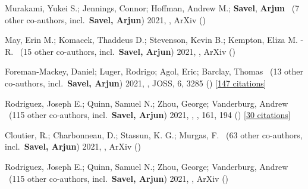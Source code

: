 \item[{\color{numcolor}\scriptsize9}] Murakami, Yukei S.; Jennings, Connor; Hoffman, Andrew M.; \textbf{Savel}, \textbf{Arjun} \etal\ ({7} other co-authors, incl.\ \textbf{Savel, Arjun}) 2021, , ArXiv ()

\item[{\color{numcolor}\scriptsize8}] May, Erin M.; Komacek, Thaddeus D.; Stevenson, Kevin B.; Kempton, Eliza M. -R. \etal\ ({15} other co-authors, incl.\ \textbf{Savel, Arjun}) 2021, , ArXiv ()

\item[{\color{numcolor}\scriptsize7}] Foreman-Mackey, Daniel; Luger, Rodrigo; Agol, Eric; Barclay, Thomas \etal\ ({13} other co-authors, incl.\ \textbf{Savel, Arjun}) 2021, , JOSS, {6}, 3285 () [\href{https://ui.adsabs.harvard.edu/abs/2021JOSS....6.3285F}{147 citations}]

\item[{\color{numcolor}\scriptsize6}] Rodriguez, Joseph E.; Quinn, Samuel N.; Zhou, George; Vanderburg, Andrew \etal\ ({115} other co-authors, incl.\ \textbf{Savel, Arjun}) 2021, , \aj, {161}, 194 () [\href{https://ui.adsabs.harvard.edu/abs/2021AJ....161..194R}{30 citations}]

\item[{\color{numcolor}\scriptsize5}] Cloutier, R.; Charbonneau, D.; Stassun, K. G.; Murgas, F. \etal\ ({63} other co-authors, incl.\ \textbf{Savel, Arjun}) 2021, , ArXiv ()

\item[{\color{numcolor}\scriptsize4}] Rodriguez, Joseph E.; Quinn, Samuel N.; Zhou, George; Vanderburg, Andrew \etal\ ({115} other co-authors, incl.\ \textbf{Savel, Arjun}) 2021, , ArXiv ()

